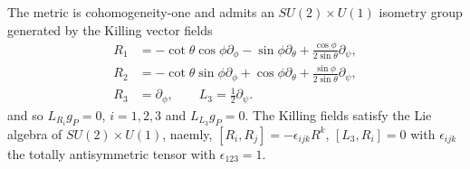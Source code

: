 \documentclass[11pt]{amsart}
\theoremstyle{plain}
\theoremstyle{definition}
\numberwithin{equation}{section}
\begin{document}
The metric is cohomogeneity-one and admits an $SU(2)\times U(1)$ isometry group generated by the Killing vector fields
\begin{equation}\label{SU(2)gen}
\begin{aligned}
R_1 &= -\cot\theta \cos\phi \partial_\phi - \sin \phi \partial_\theta + \frac{\cos\phi}{2\sin\theta} \partial_{\psi}, \\
R_2 & = -\cot\theta \sin \phi \partial_\phi + \cos\phi \partial_\theta + \frac{\sin\phi}{2\sin\theta} \partial_{\psi}, \\
R_3& = \partial_\phi, \qquad L_3 = \tfrac{1}{2}\partial_{\psi}.
\end{aligned}
\end{equation} and so $L_{R_i} g_P =0$, $i = 1,2,3$ and $L_{L_3} g_P =0$. The Killing fields satisfy the Lie algebra of $SU(2) \times U(1)$, naemly, $[R_i, R_j] = -\epsilon_{ijk} R^k$, $[L_3, R_i] = 0$ with $\epsilon_{ijk}$ the totally antisymmetric tensor with $\epsilon_{123} = 1$. 
\end{document}
